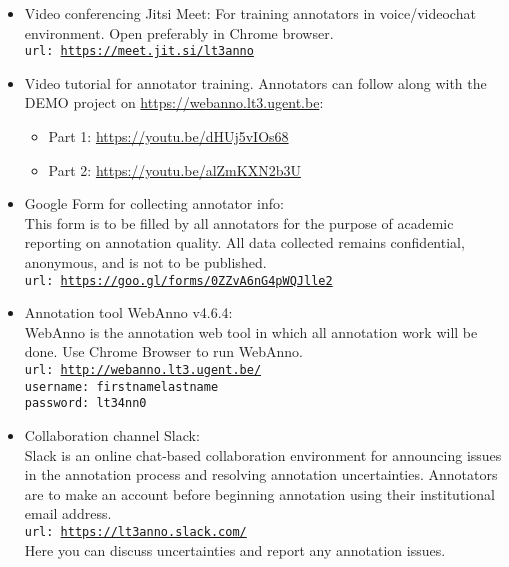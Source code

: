 {\begin{itemize}[leftmargin=*]

    \item Video conferencing Jitsi Meet: For training annotators in voice/videochat environment. Open preferably in Chrome browser.\\
        \texttt{url: \url{https://meet.jit.si/lt3anno}}
    
    \item Video tutorial for annotator training. Annotators can follow along with the DEMO project on \url{https://webanno.lt3.ugent.be}:
    \begin{itemize}
        \item Part 1: \url{https://youtu.be/dHUj5vIOs68}
        \item Part 2: \url{https://youtu.be/alZmKXN2b3U}
    \end{itemize}

    \item Google Form for collecting annotator info:\\
        This form is to be filled by all annotators for the purpose of academic reporting on annotation quality. All data collected remains confidential, anonymous, and is not to be published.\\
        \texttt{url: \url{https://goo.gl/forms/0ZZvA6nG4pWQJlle2}}
    
    \item Annotation tool WebAnno v4.6.4:\\
        WebAnno is the annotation web tool in which all annotation work will be done.
        Use Chrome Browser to run WebAnno.\\
        \texttt{url: \url{http://webanno.lt3.ugent.be/}}\\
        \texttt{username: firstnamelastname}\\
        \texttt{password: lt34nn0}
        
    \item Collaboration channel Slack:\\
        Slack is an online chat-based collaboration environment for announcing issues in the annotation process and resolving annotation uncertainties. Annotators are to make an account before beginning annotation using their institutional email address.\\
        \texttt{url: \url{https://lt3anno.slack.com/}}\\
        
        Here you can discuss uncertainties and report any annotation issues.
\end{itemize}

}
